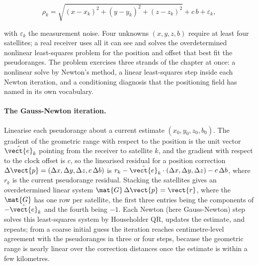 \[
\rho_{k} = \sqrt{(x - x_{k})^{2} + (y - y_{k})^{2} + (z - z_{k})^{2}} + c\,b
+ \varepsilon_{k},
\]

with $\varepsilon_{k}$ the measurement noise. Four unknowns $(x, y, z, b)$
require at least four satellites; a real receiver uses all it can see and
solves the overdetermined nonlinear least-squares problem for the position and
offset that best fit the pseudoranges. The problem exercises three strands of
the chapter at once: a nonlinear solve by Newton's method, a linear
least-squares step inside each Newton iteration, and a conditioning diagnosis
that the positioning field has named in its own vocabulary.

\paragraph{The Gauss-Newton iteration.}
Linearise each pseudorange about a current estimate $(x_{0}, y_{0}, z_{0},
b_{0})$. The gradient of the geometric range with respect to the position is
the unit vector $\hat{\vect{e}}_{k}$ pointing from the receiver to satellite
$k$, and the gradient with respect to the clock offset is $c$, so the
linearised residual for a position correction $\Delta\vect{p} = (\Delta x,
\Delta y, \Delta z, c\,\Delta b)$ is $r_{k} - \hat{\vect{e}}_{k} \cdot
(\Delta x, \Delta y, \Delta z) - c\,\Delta b$, where $r_{k}$ is the current
pseudorange residual. Stacking the satellites gives an overdetermined linear
system $\mat{G}\,\Delta\vect{p} = \vect{r}$, where the  $\mat{G}$ has one row per satellite, the first three entries being the
components of $-\hat{\vect{e}}_{k}$ and the fourth being $-1$. Each Newton (here
Gauss-Newton) step solves this least-squares system by Householder QR, updates
the estimate, and repeats; from a coarse initial guess the iteration reaches
centimetre-level agreement with the pseudoranges in three or four steps,
because the geometric range is nearly linear over the correction distances once
the estimate is within a few kilometres.

